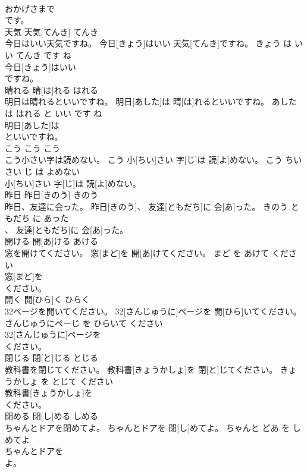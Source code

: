 \documentclass[8pt]{extreport}
\begin{document}
\begin{CJK}{UTF8}{min}
\\	おかげさまで
\\	です。			
\\	天気	天気[てんき]	てんき	
\\	今日はいい天気ですね。	今日[きょう]はいい 天気[てんき]ですね。	きょう は いい てんき です ね	
\\	今日[きょう]はいい
\\	ですね。			
\\	晴れる	晴[は]れる	はれる	
\\	明日は晴れるといいですね。	明日[あした]は 晴[は]れるといいですね。	あした は はれる と いい です ね	
\\	明日[あした]は
\\	といいですね。			
\\	こう	こう	こう	
\\	こう小さい字は読めない。	こう 小[ちい]さい 字[じ]は 読[よ]めない。	こう ちいさい じ は よめない	
\\	小[ちい]さい 字[じ]は 読[よ]めない。			
\\	昨日	昨日[きのう]	きのう	
\\	昨日、友達に会った。	昨日[きのう]、 友達[ともだち]に 会[あ]った。	きのう ともだち に あった	
\\	、 友達[ともだち]に 会[あ]った。			
\\	開ける	開[あ]ける	あける	
\\	窓を開けてください。	窓[まど]を 開[あ]けてください。	まど を あけて ください	
\\	窓[まど]を
\\	ください。			
\\	開く	開[ひら]く	ひらく	
\\	32ページを開いてください。	32[さんじゅうに]ページを 開[ひら]いてください。	さんじゅうにぺーじ を ひらいて ください	
\\	32[さんじゅうに]ページを
\\	ください。			
\\	閉じる	閉[と]じる	とじる	
\\	教科書を閉じてください。	教科書[きょうかしょ]を 閉[と]じてください。	きょうかしょ を とじて ください	
\\	教科書[きょうかしょ]を
\\	ください。			
\\	閉める	閉[し]める	しめる	
\\	ちゃんとドアを閉めてよ。	ちゃんとドアを 閉[し]めてよ。	ちゃんと どあ を しめてよ	
\\	ちゃんとドアを
\\	よ。			

\end{CJK}
\end{document}
